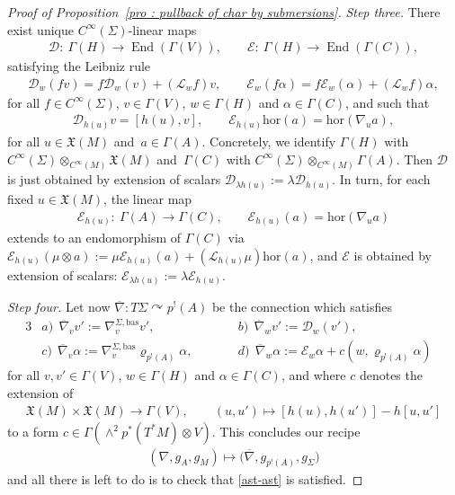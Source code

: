 \documentclass[pdftex]{sigma}
\numberwithin{equation}{section}
\newcommand{\rmap}{\longrightarrow}
\newcommand{\acts}{\curvearrowright}
\newcommand{\hor}{\mathrm{hor}}
\newcommand{\8}{\infty}
\newcommand{\X}{\mathfrak{X}}
\begin{document}
\begin{proof}[Proof of Proposition~\ref{pro : pullback of char by submersions}]
{\it Step three.} There exist unique $C^{\8}(\Sigma)$-linear maps
 \begin{gather*}
 \mathcal{D}\colon \ \Gamma(H) \to \operatorname{End}(\Gamma(V)), \qquad \mathcal{E}\colon \ \Gamma(H) \rmap \operatorname{End}(\Gamma(C)),
 \end{gather*}satisfying the Leibniz rule
 \begin{gather*}
 \mathcal{D}_{w}(fv) = f\mathcal{D}_{w}(v) + (\mathscr{L}_{w}f)v, \qquad \mathcal{E}_{w}(f\alpha) = f\mathcal{E}_{w}(\alpha)+(\mathscr{L}_wf)\alpha,
 \end{gather*}for all $f \in C^{\8}(\Sigma)$, $v \in \Gamma(V)$, $w \in \Gamma(H)$ and $\alpha \in \Gamma(C)$, and such that
 \begin{gather*}
 \mathcal{D}_{h(u)}v = [h(u),v], \qquad \mathcal{E}_{h(u)}\mathrm{hor}(a) = \mathrm{hor}(\nabla_ua),
 \end{gather*}for all $u \in \X(M)$ and~$a \in \Gamma(A)$. Concretely, we identify $\Gamma(H)$ with $C^{\8}(\Sigma) \otimes_{C^{\8}(M)} \X(M)$ and~$\Gamma(C)$ with $C^{\8}(\Sigma) \otimes_{C^{\8}(M)} \Gamma(A)$. Then $\mathcal{D}$ is just obtained by extension of scalars $\mathcal{D}_{\lambda h(u)}:=\lambda\mathcal{D}_{h(u)}$. In turn, for each fixed $u \in \X(M)$, the linear map
 \begin{gather*}
 \mathcal{E}_{h(u)}\colon \ \Gamma(A) \rmap \Gamma(C), \qquad \mathcal{E}_{h(u)}(a)=\mathrm{hor}(\nabla_ua)
 \end{gather*}extends to an endomorphism of $\Gamma(C)$ via $\mathcal{E}_{h(u)}(\mu \otimes a):=\mu \mathcal{E}_{h(u)}(a)+(\mathscr{L}_{h(u)}\mu)\hor(a)$, and $\mathcal{E}$ is obtained by extension of scalars: $\mathcal{E}_{\lambda h(u)}:=\lambda \mathcal{E}_{h(u)}$.

{\it Step four.} Let now $\overline{\nabla}\colon T\Sigma \acts p^!(A)$ be the connection which satisfies
 \begin{alignat*}{3}
& a) \ \ \overline{\nabla}_vv':=\nabla^{\Sigma,\mathrm{bas}}_{v}v', \qquad && b) \ \ \overline{\nabla}_{w}v':=\mathcal{D}_w(v'), & \\
& c) \ \ \overline{\nabla}_v\alpha:=\nabla^{\Sigma,\mathrm{bas}}_{v}\varrho_{p^!(A)}\alpha, \qquad && d) \ \ \overline{\nabla}_{w}\alpha:=\mathcal{E}_{w}\alpha+c(w,\varrho_{p^!(A)}\alpha)&
 \end{alignat*} for all $v,v' \in \Gamma(V)$, $w \in \Gamma(H)$ and $\alpha \in \Gamma(C)$, and where $c$ denotes the extension of
 \begin{gather*}
 \X(M) \times \X(M) \rmap \Gamma(V), \qquad (u,u') \mapsto [h(u),h(u')]-h[u,u']
 \end{gather*}to a form $c\in \Gamma(\wedge^2p^*(T^*M)\otimes V)$. This concludes our recipe
 \begin{gather*}
 (\nabla,g_A,g_M) \mapsto \big(\overline{\nabla},g_{p^!(A)},g_{\Sigma}\big)
 \end{gather*}and all there is left to do is to check that \eqref{ast-ast} is satisfied.


\end{proof}
\end{document}
